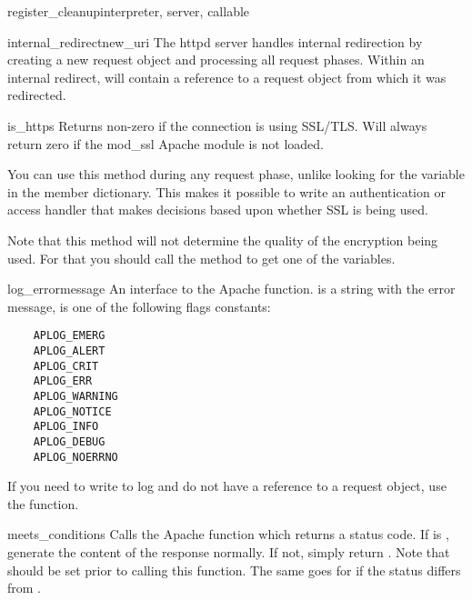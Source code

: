 \begin{funcdesc}{register_cleanup}{interpreter, server, callable}
\begin{methoddesc}[request]{internal_redirect}{new_uri}
  The httpd server handles internal redirection by creating a new
  request object and processing all request phases. Within an internal
  redirect,  will contain a reference to a request
  object from which it was redirected.

\end{methoddesc}

\begin{methoddesc}[request]{is_https}{}
  Returns non-zero if the connection is using SSL/TLS. Will always return
  zero if the mod_ssl Apache module is not loaded.

  You can use this method during any request phase, unlike looking for
  the  variable in the  member dictionary.
  This makes it possible to write an authentication or access handler
  that makes decisions based upon whether SSL is being used.

  Note that this method will not determine the quality of the
  encryption being used.  For that you should call the 
  method to get one of the  variables.

\end{methoddesc}

\begin{methoddesc}{log_error}{message}
  An interface to the Apache 
  function.  is a string with the error message,
   is one of the following flags constants:

  \begin{verbatim}
    APLOG_EMERG
    APLOG_ALERT
    APLOG_CRIT
    APLOG_ERR
    APLOG_WARNING
    APLOG_NOTICE
    APLOG_INFO
    APLOG_DEBUG
    APLOG_NOERRNO
  \end{verbatim}            

  If you need to write to log and do not have a reference to a request object,
  use the  function.
\end{methoddesc}

\begin{methoddesc}[request]{meets_conditions}{}
  Calls the Apache  function which
  returns a status code.  If  is , generate
  the content of the response normally.  If not, simply return .
  Note that  should be set prior to calling this
  function.  The same goes for  if the status differs
  from .


\end{methoddesc}
\end{funcdesc}
